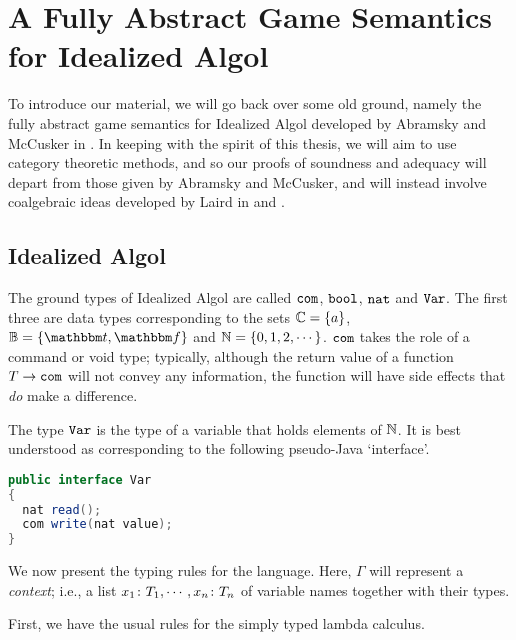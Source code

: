 \documentclass[11pt]{report}
\begin{document}
\chapter{A Fully Abstract Game Semantics for Idealized Algol}

To introduce our material, we will go back over some old ground, namely the fully abstract game semantics for Idealized Algol developed by Abramsky and McCusker in \cite{SamsonGuyIAActive}.  
In keeping with the spirit of this thesis, we will aim to use category theoretic methods, and so our proofs of soundness and adequacy will depart from those given by Abramsky and McCusker, and will instead involve coalgebraic ideas developed by Laird in \cite{laird02} and \cite{LairdCofCommCom}.

\section{Idealized Algol}

The ground types of Idealized Algol are called ${\mathtt{com}}$, ${\mathtt{bool}}$, ${\mathtt{nat}}$ and ${\mathtt{Var}}$.  
The first three are data types corresponding to the sets $\mathbb{C} = \{a\}$, $\bB = \{\true,\false\}$ and $\mathbb{N} = \{0,1,2,\cdots\}$.
${\mathtt{com}}$ takes the role of a command or void type; typically, although the return value of a function $T \to {\mathtt{com}}$ will not convey any information, the function will have side effects that \emph{do} make a difference.

The type ${\mathtt{Var}}$ is the type of a variable that holds elements of $\mathbb{N}$.
It is best understood as corresponding to the following pseudo-Java `interface'.

\begin{minipage}{\linewidth}
\begin{lstlisting}[language=Java, morekeywords={nat,com}]
public interface Var
{
  nat read();
  com write(nat value);
}
\end{lstlisting}
\end{minipage}

We now present the typing rules for the language.  
Here, $\Gamma$ will represent a \emph{context}; i.e., a list $x_1\colon T_1,\cdots,x_n\colon T_n$ of variable names together with their types.

First, we have the usual rules for the simply typed lambda calculus.

\end{document}
